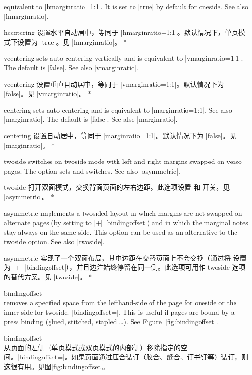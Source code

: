 \begin{Options}
\begin{paracol}{2}
  equivalent to |hmarginratio=1:1|. It is set to |true| by default for
  oneside. See also |hmarginratio|.
\switchcolumn\item[hcentering] 设置水平自动居中，等同于 |hmarginratio=1:1|。默认情况下，单页模式下设置为 |true|。见 |hmarginratio|。
\switchcolumn[0]*\item[vcentering] sets auto-centering vertically and is
  equivalent to |vmarginratio=1:1|. The default is |false|.
  See also |vmarginratio|.
\switchcolumn\item[vcentering] 设置垂直自动居中，等同于 |vmarginratio=1:1|。默认情况下为 |false|。见 |vmarginratio|。
\switchcolumn[0]*\item[centering] sets auto-centering and is equivalent to
  |marginratio=1:1|. See also |marginratio|. The default is |false|.
  See also |marginratio|.
\switchcolumn\item[centering] 设置自动居中，等同于 |marginratio=1:1|。默认情况下为 |false|。见 |marginratio|。
\switchcolumn[0]*\item[twoside] switches on twoside mode with left and right margins swapped
  on verso pages. The option sets  and  
  switches. See also |asymmetric|.
\switchcolumn\item[twoside] 打开双面模式，交换背面页面的左右边距。此选项设置  和  开关。见 |asymmetric|。
\switchcolumn[0]*\item[asymmetric] implements a twosided layout in which margins are
  not swapped on alternate pages (by setting  to 
   |+| |bindingoffset|) and in which the marginal notes
  stay always on the same side. This option can be used as an alternative
  to the twoside option. See also |twoside|.
\switchcolumn\item[asymmetric] 实现了一个双面布局，其中边距在交替页面上不会交换（通过将  设置为  |+| |bindingoffset|），并且边注始终停留在同一侧。此选项可用作 twoside 选项的替代方案。见 |twoside|。
\switchcolumn[0]*\item[bindingoffset]~\\ removes a specified space 
  from the lefthand-side of the page for oneside or the inner-side for
  twoside. |bindingoffset=|. This is useful if pages 
  are bound by a press binding (glued, stitched, stapled \ldots).
  See Figure~\ref{fig:bindingoffset}.
\switchcolumn\item[bindingoffset]~\\ 从页面的左侧（单页模式或双页模式的内部侧）移除指定的空间。|bindingoffset=|。如果页面通过压合装订（胶合、缝合、订书钉等）装订，则这很有用。见图\ref{fig:bindingoffset}。


\end{paracol}
\end{Options}
